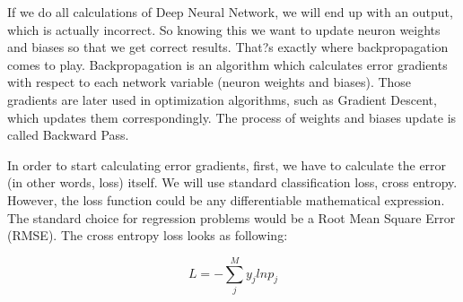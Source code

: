 If we do all calculations of Deep Neural Network, we will end up with an output, which is actually incorrect. So knowing this we want to update neuron weights and biases so that we get correct results. That?s exactly where backpropagation comes to play. Backpropagation is an algorithm which calculates error gradients with respect to each network variable (neuron weights and biases). Those gradients are later used in optimization algorithms, such as Gradient Descent, which updates them correspondingly. The process of weights and biases update is called Backward Pass.

In order to start calculating error gradients, first, we have to calculate the error (in other words, loss) itself. We will use standard classification loss, cross entropy. However, the loss function could be any differentiable mathematical expression. The standard choice for regression problems would be a Root Mean Square Error (RMSE). The cross entropy loss looks as following:

\begin{equation} \label{eq:reward-func}
L = - \sum_j^M y_j ln p_j
\end{equation}

\vfill
